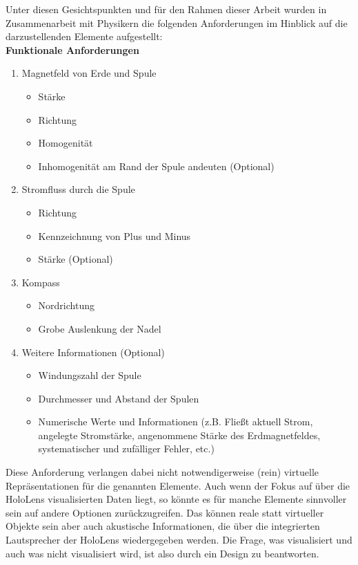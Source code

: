 Unter diesen Gesichtspunkten und für den Rahmen dieser Arbeit wurden in Zusammenarbeit mit Physikern die folgenden Anforderungen im Hinblick auf die darzustellenden Elemente aufgestellt:\\
\textbf{Funktionale Anforderungen}
\begin{enumerate}
	\setlength{\itemsep}{-5pt}
	\item Magnetfeld von Erde und Spule
	\begin{itemize}[topsep=-0.25em]
		\setlength{\itemsep}{-0.25em}
		\item Stärke
		\item Richtung
		\item Homogenität
		\item Inhomogenität am Rand der Spule andeuten (Optional) 
	\end{itemize}
	\item Stromfluss durch die Spule
	\begin{itemize}[topsep=-0.25em]
		\setlength{\itemsep}{-0.25em}
		\item Richtung
		\item Kennzeichnung von Plus und Minus
		\item Stärke (Optional) 
	\end{itemize}
	\item Kompass
	\begin{itemize}[topsep=-0.25em]
		\setlength{\itemsep}{-0.25em}
		\item Nordrichtung
		\item Grobe Auslenkung der Nadel
	\end{itemize}
	\item Weitere Informationen (Optional)
	\begin{itemize}[topsep=-0.25em]
		\setlength{\itemsep}{-0.25em}
		\item Windungszahl der Spule
		\item Durchmesser und Abstand der Spulen
		\item Numerische Werte und Informationen (z.B. Fließt aktuell Strom, angelegte Stromstärke, angenommene Stärke des Erdmagnetfeldes, systematischer und zufälliger Fehler, etc.)
	\end{itemize}
\end{enumerate}

Diese Anforderung verlangen dabei nicht notwendigerweise (rein) virtuelle Repräsentationen für die genannten Elemente. Auch wenn der Fokus auf über die HoloLens visualisierten Daten liegt, so könnte es für manche Elemente sinnvoller sein auf andere Optionen zurückzugreifen. Das können reale statt virtueller Objekte sein aber auch akustische Informationen, die über die integrierten Lautsprecher der HoloLens wiedergegeben werden. Die Frage, was visualisiert und auch was nicht visualisiert wird, ist also durch ein Design zu beantworten.\\

